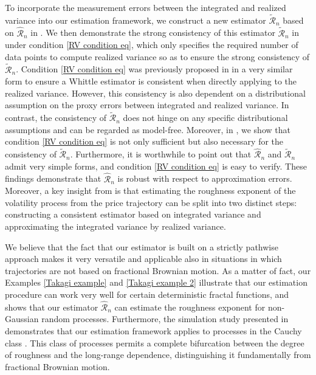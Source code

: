 \documentclass[12pt,reqno]{article}
\def\wh{\widehat}
\def\wt{\widetilde}
\numberwithin{equation}{section}
\def\cR{{\mathscr R}}
\theoremstyle{definition}
\def\wt#1{\widetilde{#1}}
\def\wh{\widehat}
\def\wt{\widetilde}
\begin{document}
To incorporate the measurement errors between the integrated and realized variance into our estimation framework, we construct a new estimator $\wt \cR_n$ based on $\wh \cR_n$ in . We then demonstrate the strong consistency of this estimator $\wt \cR_n$ in  under condition \eqref{RV condition eq}, which only specifies the required number of data points to compute realized variance so as to ensure the strong consistency of $\wt \cR_n$. Condition \eqref{RV condition eq} was previously proposed in \cite{Fukasawa2022Estimation} in a very similar form to ensure a Whittle estimator is consistent when directly applying to the realized variance. However, this consistency is also dependent on a distributional assumption on the proxy errors between integrated and realized variance. In contrast, the consistency of $\wt \cR_n$ does not hinge on any specific distributional assumptions and can be regarded as model-free. Moreover, in , we show that condition \eqref{RV condition eq} is not only sufficient but also necessary for the consistency of $\wt \cR_n$. Furthermore, it is worthwhile to point out that $\wh \cR_n$ and $\wt \cR_n$ admit very simple forms, and condition \eqref{RV condition eq} is easy to verify. These findings demonstrate that $\wh \cR_n$ is robust with respect to approximation errors. Moreover, a key insight from  is that estimating the roughness exponent of the volatility process from the price trajectory can be split into two distinct steps: constructing a consistent estimator based on integrated variance and approximating the integrated variance by realized variance.

We believe that the fact that our estimator is built on a strictly pathwise approach makes it very versatile and applicable also in situations in which trajectories are not based on fractional Brownian motion. As a matter of fact, our Examples \ref{Takagi example} and \ref{Takagi example 2} illustrate that our estimation procedure can work very well for certain deterministic fractal functions, and  shows that our estimator $\wh \cR_n$ can estimate the roughness exponent for non-Gaussian random processes. Furthermore, the simulation study presented in  demonstrates that our estimation framework applies to processes in the Cauchy class \cite{Gneiting2004Hurst}. This class of processes permits a complete bifurcation between the degree of roughness and the long-range dependence, distinguishing it fundamentally from fractional Brownian motion.
\end{document}
